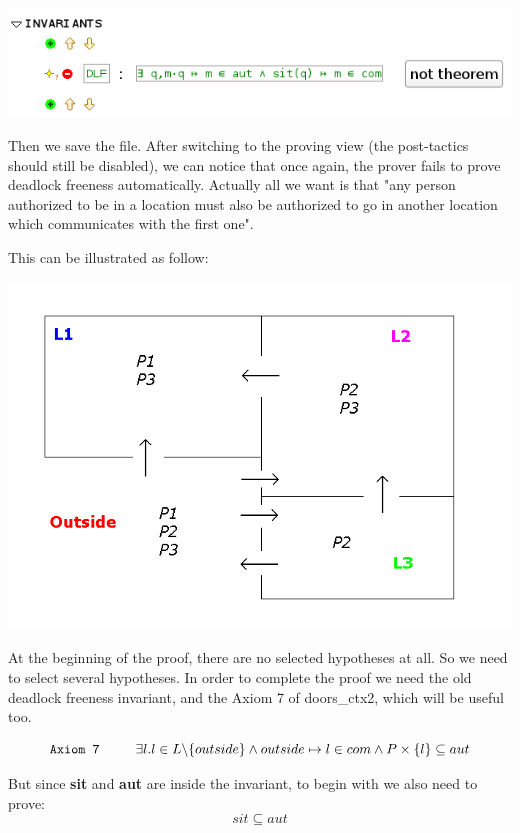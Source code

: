 \begin{center}
	\includegraphics[]{img/tutorial/tut_10_invariants2.png}
\end{center}

Then we save the file. After switching to the proving view (the post-tactics should still be disabled), we can notice that once again, the prover fails to prove deadlock freeness automatically. 
Actually all we want is that "any person authorized to be in a location must also be authorized to go in another location which communicates with the first one".

This can be illustrated as follow:
\begin{center}
	\includegraphics[]{img/tutorial/tut_10_graph.png}
\end{center}

At the beginning of the proof, there are no selected hypotheses at all. So we need to select several hypotheses. In order to complete the proof we need the old deadlock freeness invariant, and the Axiom 7 of doors\_ctx2, which will be useful too.


\[
\texttt{Axiom 7 \space \space \space \space}\exists l.l \in L \backslash \{outside\} \wedge outside \mapsto l \in com \wedge P \times \{l\} \subseteq aut
\]


But since \textbf{sit} and \textbf{aut} are inside the invariant, to begin with we also need to prove:
\[
sit \subseteq aut
\]

